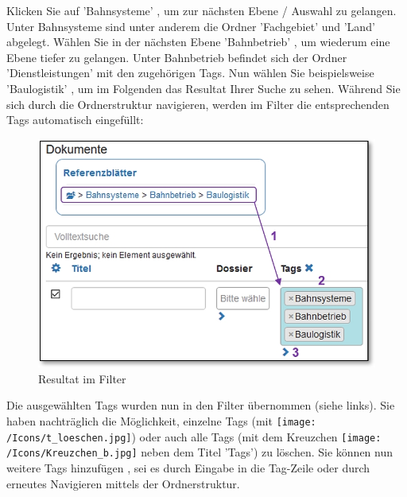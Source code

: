 Klicken Sie auf 'Bahnsysteme' , um zur nächsten Ebene / Auswahl zu gelangen. Unter Bahnsysteme sind unter anderem die Ordner 'Fachgebiet' und 'Land' abgelegt. Wählen Sie in der nächsten Ebene 'Bahnbetrieb' , um wiederum eine Ebene tiefer zu gelangen. Unter Bahnbetrieb befindet sich der Ordner 'Dienstleistungen' mit den zugehörigen Tags. Nun wählen Sie beispielsweise 'Baulogistik' , um im Folgenden das Resultat Ihrer Suche zu sehen. Während Sie sich durch die Ordnerstruktur navigieren, werden im Filter die entsprechenden Tags automatisch eingefüllt:

\vspace{\baselineskip}

\begin{figure}   %
  \vspace{-20pt}      %
  \begin{center}
    \includegraphics[width=1\linewidth]{../chapters/11_Dokumentenablage/pictures//11-htag_Tags.jpg}
  \end{center}
  \vspace{-20pt}
  \caption{Resultat im Filter}
  \vspace{-10pt}
\end{figure}

Die ausgewählten Tags wurden nun in den Filter übernommen  (siehe links). Sie haben nachträglich die Möglichkeit, einzelne Tags (mit \texttt{[image: /Icons/t\_loeschen.jpg]}) oder auch alle Tags (mit dem Kreuzchen \texttt{[image: /Icons/Kreuzchen\_b.jpg]} neben dem Titel 'Tags') zu löschen. Sie können nun weitere Tags hinzufügen , sei es durch Eingabe in die Tag-Zeile oder durch erneutes Navigieren mittels der Ordnerstruktur. 


